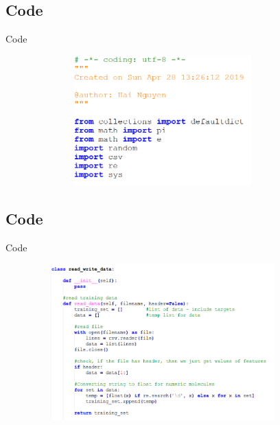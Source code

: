 \documentclass{beamer}
\begin{document}
\subsection{Code}
    \begin{frame}{Code}
        \begin{center}
            \begin{figure}
                \begin{center}
                     \includegraphics[width = 10cm, height = 5cm]{Theme/images/imports.PNG}
                \end{center}
            \end{figure}
        \end{center}
    \end{frame}

\subsection{Code}
    \begin{frame}{Code}
        \begin{center}
            \begin{figure}
                \begin{center}
                    \includegraphics[width = 10cm, height = 6cm]{Theme/images/read.PNG}
                \end{center}
            \end{figure}
        \end{center}
    \end{frame}
\end{document}
